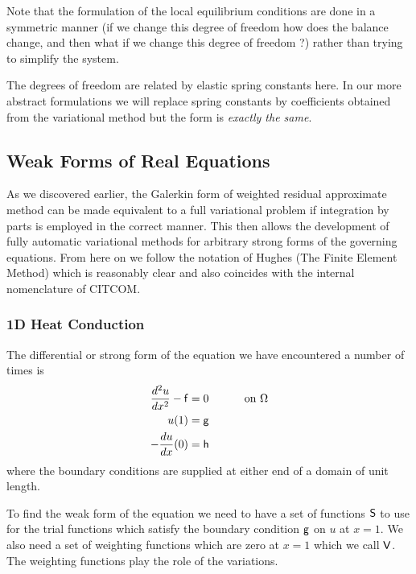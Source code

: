 \documentclass[10pt]{article}
\newcommand{\curly}{\sf }
\begin{document}
	Note that the formulation of the local equilibrium conditions
	are done in a symmetric manner (if we change this degree of 
	freedom how does the balance change, and then what if we change
	this degree of freedom ?) rather than trying to simplify the system.
	
	The degrees of freedom are related by elastic spring constants 
	here. In our more abstract formulations we will replace spring 
	constants by coefficients obtained from the variational method but
	the form is {\em exactly the same}.  
	

	\subsection{Weak Forms of Real Equations}
		
	As we discovered earlier, the Galerkin form of weighted residual approximate
	method can be made equivalent to a full variational problem if
	integration by parts is employed in the correct manner. This then
	allows the development of fully automatic variational methods
	for arbitrary strong forms of the governing equations. From here
	on we follow the notation of Hughes (The Finite Element Method)
	which is reasonably clear and also coincides with the internal
	nomenclature of CITCOM.
	
	\subsubsection{1D Heat Conduction}
	
	The differential or strong form of the equation we have encountered
	a number of times is 
		\begin{equation}
			\begin{split}
				\frac{d^2 u}{d x^2} - {\curly f} &= 0  \mbox{\hspace{1cm} on $\Omega$} \\
				u(1) & = {\curly g} \\
				-\frac{d u}{d x} (0) &= {\curly h}
			\end{split}
		\end{equation}
	where the boundary conditions are supplied at either end of a domain
	of unit length.
	
	To find the weak form of the equation we need to have a set of 
	functions $\curly S$ to use for the trial functions which satisfy the boundary
	condition $\curly g$ on $u$ at $x=1$. We also need a set of weighting
	functions which are zero at $x=1$ which we call $\curly V$. The weighting
	functions play the role of the variations.
	
\end{document}
